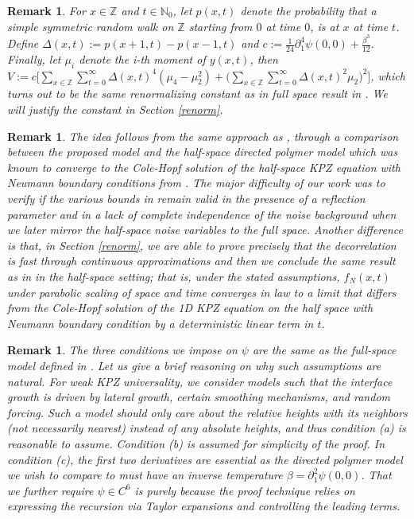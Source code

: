 \documentclass[10pt]{article}
\newtheorem{remark}[theorem]{Remark}
\begin{document}
\begin{remark} \label{V}
    For $x \in \mathbb{Z}$ and $t \in \mathbb{N}_0$, let $p(x, t)$ denote the probability that a simple symmetric random walk on $\mathbb{Z}$ starting from $0$ at time $0$, is at $x$ at time $t$. 
    Define $\Delta(x, t):=p(x+1, t)-p(x-1, t)$ and
    $c:=\frac{1}{24} \partial_{1}^{4} \psi(0,0)+\frac{\beta^{3}}{12}.$ Finally, let $\mu_i$ denote the i-th moment of $y(x,t)$, then $V:=c\Big[\sum_{x \in \mathbb{Z}} \sum_{t=0}^{\infty} \Delta(x, t)^{4}(\mu_{4}-\mu_{2}^{2})+\Big(\sum_{x \in \mathbb{Z}} \sum_{t=0}^{\infty} \Delta(x, t)^{2} \mu_{2}\Big)^{2}\Big]$, which turns out to be the same renormalizing constant as in full space result in \cite{adhikari2022invariance}. We will justify the constant in Section \ref{renorm}.

\end{remark}
\begin{remark}
The idea follows from the same approach as \cite{adhikari2022invariance}, through a comparison between the proposed model and the half-space directed polymer model which was known to converge to the Cole-Hopf solution of the half-space KPZ equation with Neumann boundary conditions from \cite{Wu20}. The major difficulty of our work was to verify if the various bounds in \cite{adhikari2022invariance} remain valid in the presence of a reflection parameter and in a lack of complete independence of the noise background when we later mirror the half-space noise variables to the full space. Another difference is that, in Section \ref{renorm}, we are able to prove precisely that the decorrelation is fast through continuous approximations and then we conclude the same result as in \cite{adhikari2022invariance} in the half-space setting; that is, under the stated assumptions, $f_{N}(x, t)$ under parabolic scaling of space and time converges in law to a limit that differs from the Cole-Hopf solution of the 1D KPZ equation on the half space with Neumann boundary condition by a deterministic linear term in $t$.     
\end{remark}

\begin{remark}
    The three conditions we impose on $\psi$ are the same as the full-space model defined in \cite{adhikari2022invariance}. Let us give a brief reasoning on why such assumptions are natural. For weak KPZ universality, we consider models such that the interface growth is driven by lateral growth, certain smoothing mechanisms, and random forcing. Such a model should only care about the relative heights with its neighbors (not necessarily nearest) instead of any absolute heights, and thus condition (a) is reasonable to assume. Condition (b) is assumed for simplicity of the proof. In condition (c), the first two derivatives are essential as the directed polymer model we wish to compare to must have an inverse temperature $\beta=\partial_{1}^{2} \psi(0,0)$. That we further require $\psi \in C^6$ is purely because the proof technique relies on expressing the recursion via Taylor expansions and controlling the leading terms.
\end{remark}
\end{document}
